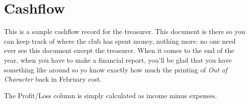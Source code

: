 \section{Cashflow}
\label{sec:cashflow}

This is a sample cashflow record for the treasurer. This document is there so you can keep track of where the club has spent money, nothing more: no one need ever see this document except the treasurer. When it comes to the end of the year, when you have to make a financial report, you'll be glad that you have something like around so yo know exactly how much the printing of \textit{Out of Character} back in February cost.

The Profit/Loss column is simply calculated as income minus expenses.

